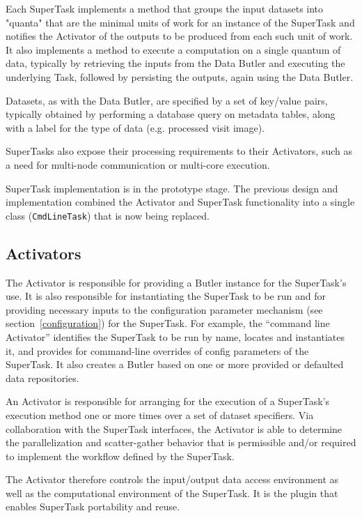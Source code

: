 \documentclass[DM,toc]{lsstdoc}
\begin{document}
Each SuperTask implements a method that groups the input datasets into "quanta"
that are the minimal units of work for an instance of the SuperTask and
notifies the Activator of the outputs to be produced from each such unit of
work.  It also implements a method to execute a computation on a single quantum
of data, typically by retrieving the inputs from the Data Butler and executing
the underlying Task, followed by persisting the outputs, again using the Data
Butler.

Datasets, as with the Data Butler, are specified by a set of key/value pairs,
typically obtained by performing a database query on metadata tables, along
with a label for the type of data (e.g. processed visit image).

SuperTasks also expose their processing requirements to their Activators, such
as a need for multi-node communication or multi-core execution.

SuperTask implementation is in the prototype stage.  The previous design and
implementation combined the Activator and SuperTask functionality into a single
class (\texttt{CmdLineTask}) that is now being replaced.

\subsection{Activators}\label{activators}

The Activator is responsible for providing a Butler instance for the
SuperTask’s use. It is also responsible for instantiating the SuperTask to be
run and for providing necessary inputs to the configuration parameter mechanism
(see section~\ref{configuration}) for the SuperTask. For example, the “command
line Activator” identifies the SuperTask to be run by name, locates and
instantiates it, and provides for command-line overrides of config parameters
of the SuperTask. It also creates a Butler based on one or more provided or
defaulted data repositories.

An Activator is responsible for arranging for the execution of a SuperTask’s
execution method one or more times over a set of dataset specifiers. Via
collaboration with the SuperTask interfaces, the Activator is able to determine
the parallelization and scatter-gather behavior that is permissible and/or
required to implement the workflow defined by the SuperTask.

The Activator therefore controls the input/output data access environment as
well as the computational environment of the SuperTask.  It is the plugin that
enables SuperTask portability and reuse.
\end{document}

